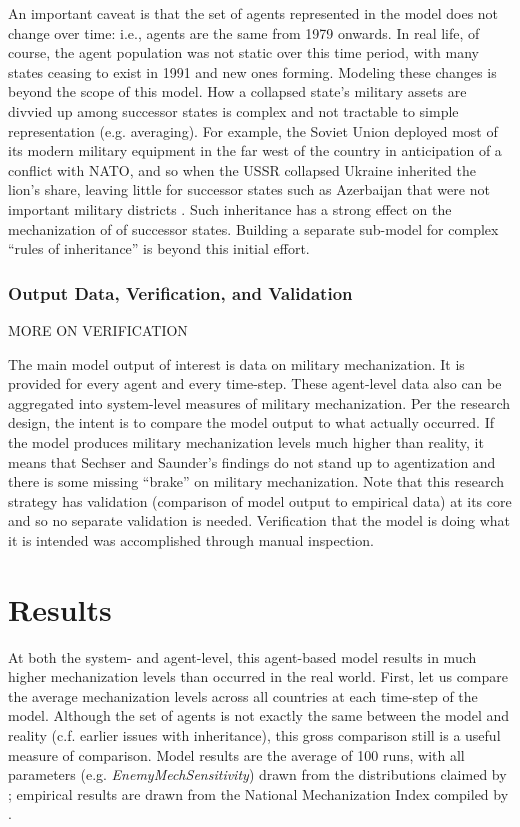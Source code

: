 \documentclass{article}
\begin{document}
An important caveat is that the set of agents represented in the model does not
change over time: i.e., agents are the same from 1979 onwards. In real life,
of course, the agent population was not static over this time period, with many
states ceasing to exist in 1991 and new ones forming. Modeling these changes is
beyond the scope of this model. How a collapsed state's military assets are divvied up
among successor states is complex and not tractable to simple representation
(e.g. averaging). For example, the Soviet Union deployed most of its modern
military equipment in the far west of the country in anticipation of a conflict
with NATO, and so when the USSR collapsed Ukraine inherited the lion's share, leaving
little for successor states such as Azerbaijan that were not important military
districts \citep{roy1993military}. Such inheritance has
a strong effect on the mechanization of of successor states. Building a separate
sub-model for  complex ``rules of inheritance'' is beyond this initial effort.

\subsubsection{Output Data, Verification, and Validation}

MORE ON VERIFICATION

The main model output of interest is data on military mechanization. It is provided for
every agent and every time-step. These agent-level data also can be aggregated
into system-level measures of military mechanization. Per the research design,
the intent is to compare the model output to what actually occurred. If the
model produces military mechanization levels much higher than reality, it means
that Sechser and Saunder's findings do not stand up to agentization and there is
some missing ``brake'' on military mechanization. Note that this research
strategy has validation (comparison of model output to empirical data) at its
core and so no separate validation is needed. Verification that the model is
doing what it is intended was accomplished through manual inspection.

\section{Results}

At both the system- and agent-level, this agent-based model results in much
higher mechanization levels than occurred in the real world. First, let us
compare the average mechanization levels across all countries at each time-step
of the model. Although the set of agents is not exactly the same between the
model and reality (c.f. earlier issues with inheritance), this
gross comparison still is a useful measure of comparison. Model results are
the average of 100 runs, with all parameters (e.g.
\textit{EnemyMechSensitivity}) drawn from the distributions claimed by
\citet{sechser2010army}; empirical results are drawn from the National
Mechanization Index compiled by \citet{sechser2010army}.
\end{document}
